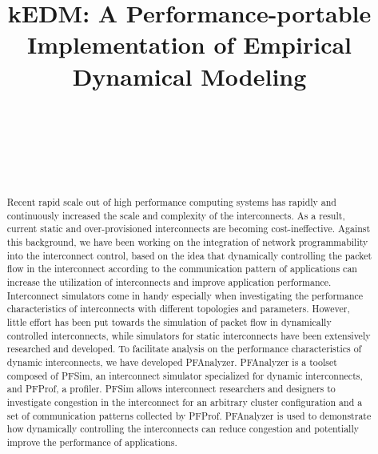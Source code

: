 \documentclass[conference]{IEEEtran}
\begin{document}

\title{kEDM: A Performance-portable Implementation of Empirical Dynamical Modeling}

\author{%
     \\
    \and
     \\
    \and
     \\
}

\maketitle

\begin{abstract}
Recent rapid scale out of high performance computing systems has
rapidly and continuously increased the scale and complexity of the
interconnects. As a result, current static and over-provisioned
interconnects are becoming cost-ineffective. Against this background, we have
been working on the integration of network programmability into
the interconnect control, based on the idea that dynamically controlling
the packet flow in the interconnect according to the communication pattern
of applications can increase the utilization of interconnects and improve
application performance. Interconnect simulators come in handy especially
when investigating the performance characteristics of interconnects with
different topologies and parameters. However, little effort has been put
towards the simulation of packet flow in dynamically controlled interconnects,
while simulators for static interconnects have been extensively researched
and developed. To facilitate analysis on the performance
characteristics of dynamic interconnects, we have developed PFAnalyzer.
PFAnalyzer is a toolset composed of PFSim, an interconnect simulator
specialized for dynamic interconnects, and PFProf, a profiler.
PFSim allows interconnect researchers and designers to investigate
congestion in the interconnect for an arbitrary cluster configuration and
a set of communication patterns collected by PFProf. PFAnalyzer is used
to demonstrate how dynamically controlling the interconnects can reduce
congestion and potentially improve the performance of applications.
\end{abstract}
\end{document}
